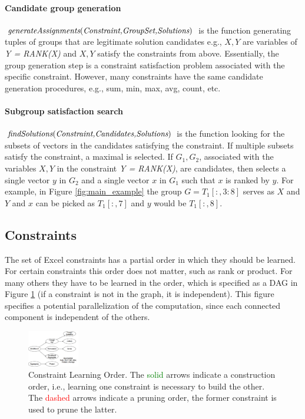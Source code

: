\documentclass{ecai}
\begin{document}
\paragraph{Candidate group generation} $\textit{generateAssignments}(\textit{Constraint,GroupSet,Solutions})$ is the function generating tuples of groups that are legitimate solution candidates e.g., $X,Y$ are variables of \textit{Y = RANK(X)} and $X,Y$ satisfy the constraints from \CSignature above. Essentially, the group generation step is a constraint satisfaction problem associated with the specific constraint. However, many constraints have the same candidate generation procedures, e.g., sum, min, max, avg, count, etc.

\paragraph{Subgroup satisfaction search} $\textit{findSolutions}(\textit{Constraint,Candidates,Solutions})$ is the function looking for the subsets of vectors in the candidates satisfying the constraint. If multiple subsets satisfy the constraint, a maximal is selected. If $G_1,G_2$, associated with the variables $X,Y$ in the constraint \textit{Y = RANK(X)}, are candidates, then \findassignment selects a single vector $y$ in $G_2$ and a single vector $x$ in $G_1$ such that $x$ is ranked by $y$. For example, in Figure \ref{fig:main_example} the group $G = T_1[{:},3{:}8]$ serves as $X$ and $Y$ and $x$ can be picked as $T_1[{:},7]$ and $y$ would be $T_1[{:},8]$.

\subsection{Constraints}
The set of Excel constraints has a partial order in which they should be learned. For certain constraints this order does not matter, such as rank or product. For many others they have to be learned in the order, which is specified as a DAG in Figure \ref{fig:learning_order} (if a constraint is not in the graph, it is independent). This figure specifies a potential parallelization of the computation, since each connected component is independent of the others.

\begin{figure}[htb]
  \centering
  \includegraphics[width=0.20\textwidth]{figures/constraint_dependency.png}
  \caption{Constraint Learning Order. The \textcolor{green}{solid} arrows indicate a construction order, i.e., learning one constraint is necessary to build the other. The \textcolor{red}{dashed} arrows indicate a pruning order, the former constraint is used to prune the latter.}
  \label{fig:learning_order}
\end{figure}
\end{document}
